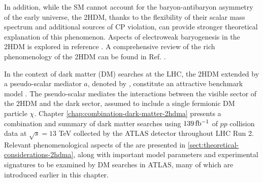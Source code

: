 In addition, while the SM cannot account for the baryon-antibaryon asymmetry of the early universe, the 2HDM, thanks to the flexibility of their scalar mass spectrum and additional sources of CP violation, can provide stronger theoretical explanation of this phenomenon. Aspects of electroweak baryogenesis in the 2HDM is explored in reference \cite{Joyce_1996, Funakubo_1994, Cline_1996, PhysRevD.55.3873, LAINE200123, LarsFromme_2006}. A comprehensive review of the rich phenomenology of the 2HDM can be found in Ref. \cite{Branco_2012}.

In the context of dark matter (DM) searches at the LHC, the 2HDM extended by a pseudo-scalar mediator $a$, denoted by \thdma, constitute an attractive benchmark model \cite{2HDMWGproxi}. The pseudo-scalar mediates the interactions between the visible sector of the 2HDM and the dark sector, assumed to include a single fermionic DM particle $\chi$. Chapter \ref{chap:combination-dark-matter-2hdma} presents a combination and summary of dark matter searches using $139\, \mbox{fb\(^{-1}\)}$ of $pp$ collision data at $\sqrt{s}=13$ TeV collected by the ATLAS detector throughout LHC Run 2. 
Relevant phenomenological aspects of the \thdma are presented in \ref{sect:theoretical-considerations-2hdma}, along with important model parameters and experimental signatures to be examined by DM searches in ATLAS, many of which are introduced earlier in this chapter. 